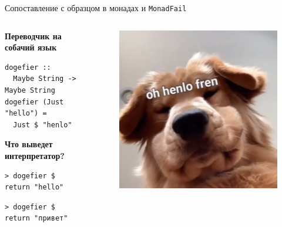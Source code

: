 \documentclass{beamer}
\begin{document}
\begin{frame}[fragile]{Сопоставление с образцом в монадах и \texttt{MonadFail}}
    \begin{columns}
    \begin{column}{0.5\textwidth}
\textbf{Переводчик на собачий язык}
    \begin{verbatim}
dogefier :: 
  Maybe String -> Maybe String
dogefier (Just "hello") = 
  Just $ "henlo"
    \end{verbatim}
    
\textbf{Что выведет интерпретатор?}
\begin{verbatim}
> dogefier $ return "hello"
\end{verbatim}
\begin{verbatim}
> dogefier $ return "привет"
\end{verbatim}
    \end{column}
    \begin{column}{0.5\textwidth}
    \begin{figure}
        \centering
        \includegraphics[scale=0.3]{media/henlo.png}
    \end{figure}
    \end{column}
    \end{columns}
\end{frame}
\end{document}
